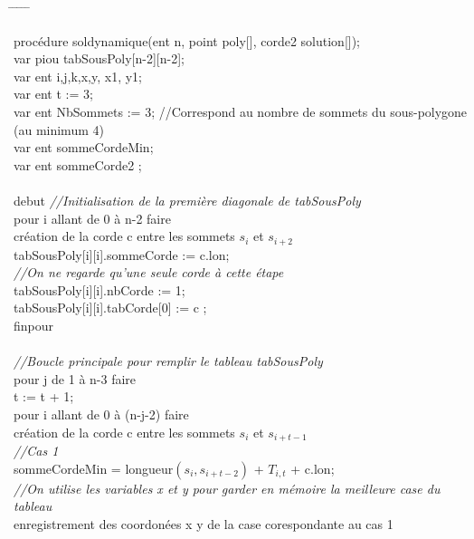 \documentclass[a4paper,10pt]{article}
\begin{document}
\begin{tabbing}
\hspace{0.4cm} \= \hspace{0.4cm}  \= \hspace{0.4cm} \= \hspace{0.4cm} \= \hspace{0.4cm} \= \kill

procédure soldynamique(ent n, point poly[], corde2 solution[]); \\
var piou tabSousPoly[n-2][n-2]; \\
var ent i,j,k,x,y, x1, y1; \\
var ent t := 3; \\
var ent NbSommets := 3; //Correspond au nombre de sommets du sous-polygone (au minimum 4) \\
var ent sommeCordeMin; \\
var ent sommeCorde2 ; \\
\\
debut
\textit{//Initialisation de la première diagonale de tabSousPoly}\\
pour i allant de 0 à n-2 faire\\
  \> création de la corde c entre les sommets \(s_i\) et \(s_{i+2}\) \\
  \> tabSousPoly[i][i].sommeCorde := c.lon; \\
  \> \textit{//On ne regarde qu'une seule corde à cette étape} \\
  \> tabSousPoly[i][i].nbCorde := 1; \\
  \> tabSousPoly[i][i].tabCorde[0] := c ; \\
finpour\\
\\
\textit{//Boucle principale pour remplir le tableau tabSousPoly }\\
pour j de 1 à n-3 faire\\
    \> t := t + 1;\\ 
    \> pour i allant de 0 à (n-j-2) faire\\
	\> \> création de la corde c entre les sommets \(s_i\) et \(s_{i+t-1}\) \\
	\> \> \textit{//Cas 1} \\
	\> \> sommeCordeMin = longueur$(s_i, s_{i+t-2})$ + $T_{i,t}$ + c.lon; \\
	\> \> \textit{//On utilise les variables x et y pour garder en mémoire la meilleure case du tableau }\\ 
	\> \> enregistrement des coordonées x y de la case corespondante au cas 1 \\

\end{tabbing}
\end{document}
